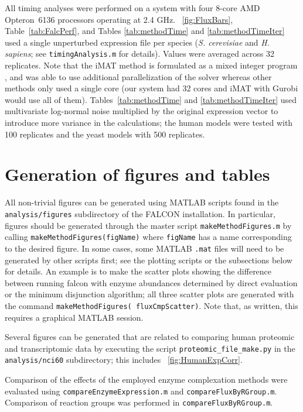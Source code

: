 All timing analyses were performed on a system with four 8-core AMD
Opteron\texttrademark\ 6136 processors operating at 2.4
GHz. \Fig~\ref{fig:FluxBars}, Table~\ref{tab:FalcPerf}, and \suppOrApp
Tables \ref{tab:methodTime} and \ref{tab:methodTimeIter} used a single
unperturbed expression file per species (\textit{S. cerevisiae} and
\textit{H. sapiens}; see \texttt{timingAnalysis.m} for
details). Values were averaged across 32 replicates. \suppOrApp
Note that the iMAT method is formulated as a mixed integer program
\citep{Shlomi2008}, and was able to use additional parallelization of
the solver \citep{gurobi} whereas other methods only used a single
core (our system had 32 cores and iMAT with Gurobi would use all of
them). Tables~\ref{tab:methodTime} and \ref{tab:methodTimeIter} used
multivariate log-normal noise multiplied by the original expression
vector to introduce more variance in the calculations; the human
models were tested with 100 replicates and the yeast models with 500
replicates.

\section{Generation of figures and tables}

All non-trivial figures can be generated using MATLAB scripts found in
the \texttt{analysis/figures} subdirectory of the FALCON installation.
In particular, figures should be generated through the master script
\texttt{makeMethodFigures.m} by calling
\texttt{makeMethodFigures(figName)} where \texttt{figName} has a name
corresponding to the desired figure.  In some cases, some MATLAB
\texttt{.mat} files will need to be generated by other scripts first;
see the plotting scripts or the subsections below for details. An
example is to make the scatter plots showing the difference between
running falcon with enzyme abundances determined by direct evaluation
or the minimum disjunction algorithm; all three scatter plots are
generated with the command \texttt{makeMethodFigures(\textquotesingle
fluxCmpScatter\textquotesingle)}. Note that, as written, this requires
a graphical MATLAB session.

Several figures can be generated that are related to comparing 
human proteomic and transcriptomic data by executing the script 
\texttt{proteomic\_file\_make.py} in the \texttt{analysis/nci60}
subdirectory; this includes \suppOrApp \Fig~\ref{fig:HumanExpCorr}.


\begin{sloppypar}
Comparison of the effects of the employed enzyme complexation methods
were evaluated using \texttt{compareEnzymeExpression.m} and 
\texttt{compareFluxByRGroup.m}. Comparison of reaction groups was
performed in \texttt{compareFluxByRGroup.m}.
\end{sloppypar}


